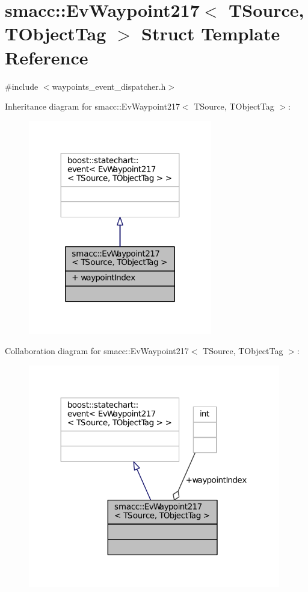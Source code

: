 \hypertarget{structsmacc_1_1EvWaypoint217}{}\section{smacc\+:\+:Ev\+Waypoint217$<$ T\+Source, T\+Object\+Tag $>$ Struct Template Reference}
\label{structsmacc_1_1EvWaypoint217}


{\ttfamily \#include $<$waypoints\+\_\+event\+\_\+dispatcher.\+h$>$}



Inheritance diagram for smacc\+:\+:Ev\+Waypoint217$<$ T\+Source, T\+Object\+Tag $>$\+:
\nopagebreak
\begin{figure}[H]
\begin{center}
\leavevmode
\includegraphics[width=227pt]{structsmacc_1_1EvWaypoint217__inherit__graph}
\end{center}
\end{figure}


Collaboration diagram for smacc\+:\+:Ev\+Waypoint217$<$ T\+Source, T\+Object\+Tag $>$\+:
\nopagebreak
\begin{figure}[H]
\begin{center}
\leavevmode
\includegraphics[width=312pt]{structsmacc_1_1EvWaypoint217__coll__graph}
\end{center}
\end{figure}
